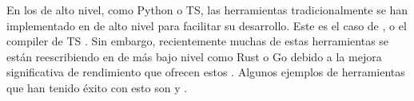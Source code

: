 En los  de alto nivel, como Python o
\gls{TS}, las herramientas tradicionalmente se han implementado en
 de alto nivel para facilitar su
desarrollo. Este es el caso de ,  o el
\gls{compiler} de \gls{TS} \parencite{tsc}. Sin embargo, recientemente muchas de
estas herramientas se están reescribiendo en  de más bajo nivel como Rust o Go debido a la mejora
significativa de rendimiento que ofrecen estos  \parencite{typescript-go}. Algunos ejemplos de herramientas
que han tenido éxito con esto son  y .
